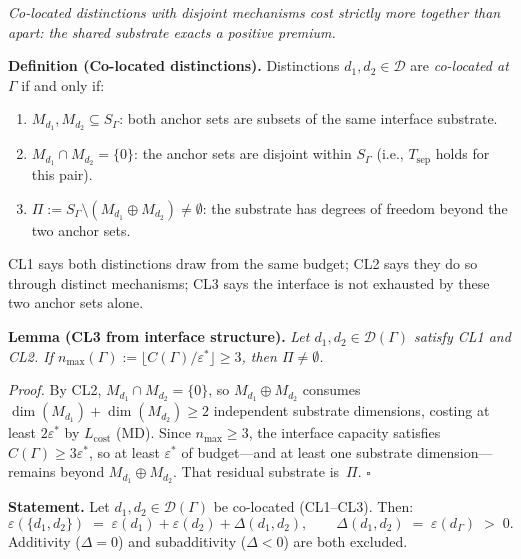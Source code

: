 \documentclass[11pt]{article}
\theoremstyle{remark}
\begin{document}
\begin{tcolorbox}[apfbox, title={$L_{\Delta}$ (Competition): Superadditivity from Substrate Integrity}]
\textit{Co-located distinctions with disjoint mechanisms cost strictly more together than apart: the shared substrate exacts a positive premium.}

\smallskip\noindent\textbf{Definition (Co-located distinctions).}  Distinctions $d_1, d_2 \in \mathcal{D}$ are \emph{co-located at $\Gamma$} if and only if:
\begin{enumerate}[nosep,leftmargin=2em,itemsep=2pt,label=(\textbf{CL\arabic*})]
  \item $M_{d_1}, M_{d_2} \subseteq S_\Gamma$: both anchor sets are subsets of the same interface substrate.
  \item $M_{d_1} \cap M_{d_2} = \{0\}$: the anchor sets are disjoint within $S_\Gamma$ (i.e., $T_{\mathrm{sep}}$ holds for this pair).
  \item $\Pi := S_\Gamma \setminus (M_{d_1} \oplus M_{d_2}) \ne \emptyset$: the substrate has degrees of freedom beyond the two anchor sets.
\end{enumerate}
CL1 says both distinctions draw from the same budget; CL2 says they do so through distinct mechanisms; CL3 says the interface is not exhausted by these two anchor sets alone.

\smallskip\noindent\textbf{Lemma (CL3 from interface structure).}\label{prop:generic_coloc}
\textit{Let $d_1, d_2 \in \mathcal{D}(\Gamma)$ satisfy CL1 and CL2.  If $n_{\max}(\Gamma) := \lfloor C(\Gamma)/\varepsilon^*\rfloor \ge 3$, then $\Pi \ne \emptyset$.}

\smallskip\noindent\textit{Proof.}  By CL2, $M_{d_1} \cap M_{d_2} = \{0\}$, so $M_{d_1} \oplus M_{d_2}$ consumes $\dim(M_{d_1}) + \dim(M_{d_2}) \ge 2$ independent substrate dimensions, costing at least $2\varepsilon^*$ by $L_{\mathrm{cost}}$ (MD).  Since $n_{\max} \ge 3$, the interface capacity satisfies $C(\Gamma) \ge 3\varepsilon^*$, so at least $\varepsilon^*$ of budget---and at least one substrate dimension---remains beyond $M_{d_1} \oplus M_{d_2}$.  That residual substrate is~$\Pi$.  \hfill$\square$


\medskip\noindent\textbf{Statement.}  Let $d_1, d_2 \in \mathcal{D}(\Gamma)$ be co-located (CL1--CL3).  Then:
\begin{equation}\label{eq:Ldelta}
\varepsilon(\{d_1, d_2\}) \;=\; \varepsilon(d_1) + \varepsilon(d_2) + \Delta(d_1, d_2), \qquad \Delta(d_1, d_2) \;=\; \varepsilon(d_\Gamma) \;>\; 0.
\end{equation}
Additivity ($\Delta = 0$) and subadditivity ($\Delta < 0$) are both excluded.


\end{tcolorbox}
\end{document}
